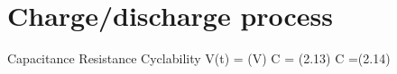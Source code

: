 \section{Charge/discharge process}
Capacitance
Resistance 
Cyclability 
V(t) = (V)
C = (2.13)
C =(2.14)


